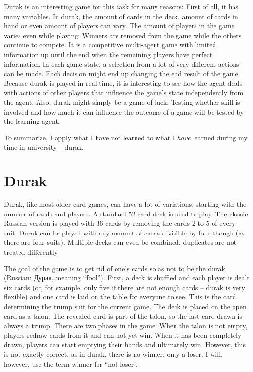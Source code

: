 \documentclass[a4paper,titlepage]{article}
\begin{document}
Durak is an interesting game for this task for many reasons: First of all, it has many variables. In durak, the amount of cards in the deck, amount of cards in hand or even amount of players can vary. The amount of players in the game varies even while playing: Winners are removed from the game while the others continue to compete. It is a competitive multi-agent game with limited information up until the end when the remaining players have perfect information. In each game state, a selection from a lot of very different actions can be made. Each decision might end up changing the end result of the game.
Because durak is played in real time, it is interesting to see how the agent deals with actions of other players that influence the game's state independently from the agent.
Also, durak might simply be a game of luck. Testing whether skill is involved and how much it can influence the outcome of a game will be tested by the learning agent.

To summarize, I apply what I have not learned to what I \emph{have} learned during my time in university -- durak.

\newpage

\section{Durak}

Durak, like most older card games, can have a lot of variations, starting with the number of cards and players. A standard 52-card deck is used to play. The classic Russian version is played with 36 cards by removing the cards 2 to 5 of every suit. Durak can be played with any amount of cards divisible by four though (as there are four suits). Multiple decks can even be combined, duplicates are not treated differently.

The goal of the game is to get rid of one's cards so as not to be the durak (Russian: Дурак, meaning ``fool''). First, a deck is shuffled and each player is dealt six cards (or, for example, only five if there are not enough cards -- durak is very flexible) and one card is laid on the table for everyone to see. This is the card determining the trump suit for the current game. The deck is placed on the open card as a talon. The revealed card is part of the talon, so the last card drawn is always a trump.
There are two phases in the game: When the talon is not empty, players redraw cards from it and can not yet win. When it has been completely drawn, players can start emptying their hands and ultimately win. However, this is not exactly correct, as in durak, there is no winner, only a loser. I will, however, use the term winner for ``not loser''. \medskip
\end{document}
